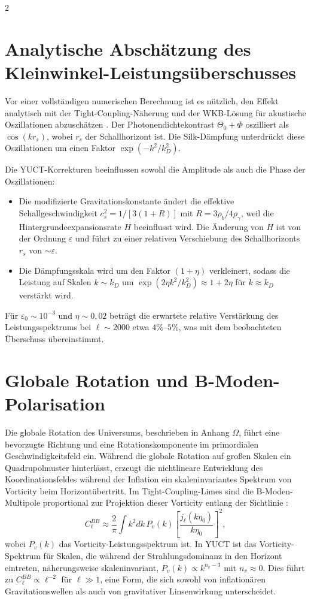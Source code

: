 \documentclass[11pt,a4paper]{article}
\begin{document}
\begin{multicols}{2}
		\section{Analytische Abschätzung des Kleinwinkel-Leistungsüberschusses}
		
		Vor einer vollständigen numerischen Berechnung ist es nützlich, den Effekt analytisch mit der Tight-Coupling-Näherung und der WKB-Lösung für akustische Oszillationen abzuschätzen \cite{Hu1995}. Der Photonendichtekontrast $\Theta_0 + \Phi$ oszilliert als $\cos(k r_s)$, wobei $r_s$ der Schallhorizont ist. Die Silk-Dämpfung unterdrückt diese Oszillationen um einen Faktor $\exp(-k^2/k_D^2)$.
		
		Die YUCT-Korrekturen beeinflussen sowohl die Amplitude als auch die Phase der Oszillationen:
		\begin{itemize}
			\item Die modifizierte Gravitationskonstante ändert die effektive Schallgeschwindigkeit $c_s^2 = 1/[3(1+R)]$ mit $R = 3\rho_b/4\rho_\gamma$, weil die Hintergrundeexpansionsrate $H$ beeinflusst wird. Die Änderung von $H$ ist von der Ordnung $\varepsilon$ und führt zu einer relativen Verschiebung des Schallhorizonts $r_s$ von $\sim \varepsilon$.
			\item Die Dämpfungsskala wird um den Faktor $(1+\eta)$ verkleinert, sodass die Leistung auf Skalen $k \sim k_D$ um $\exp(2\eta k^2/k_D^2) \approx 1 + 2\eta$ für $k \approx k_D$ verstärkt wird.
		\end{itemize}
		Für $\varepsilon_0 \sim 10^{-3}$ und $\eta \sim 0,02$ beträgt die erwartete relative Verstärkung des Leistungsspektrums bei $\ell \sim 2000$ etwa $4\%$--$5\%$, was mit dem beobachteten Überschuss übereinstimmt.
		
		\section{Globale Rotation und B-Moden-Polarisation}
		
		Die globale Rotation des Universums, beschrieben in Anhang $\Omega$, führt eine bevorzugte Richtung und eine Rotationskomponente im primordialen Geschwindigkeitsfeld ein. Während die globale Rotation auf großen Skalen ein Quadrupolmuster hinterlässt, erzeugt die nichtlineare Entwicklung des Koordinationsfeldes während der Inflation ein skaleninvariantes Spektrum von Vorticity beim Horizontübertritt. Im Tight-Coupling-Limes sind die B-Moden-Multipole proportional zur Projektion dieser Vorticity entlang der Sichtlinie \cite{Cooray2005}:
		\begin{equation}
			C_\ell^{BB} \approx \frac{2}{\pi} \int k^2 dk \, P_v(k) \left[ \frac{j_\ell(k\eta_0)}{k\eta_0} \right]^2,
		\end{equation}
		wobei $P_v(k)$ das Vorticity-Leistungsspektrum ist. In YUCT ist das Vorticity-Spektrum für Skalen, die während der Strahlungsdominanz in den Horizont eintreten, näherungsweise skaleninvariant, $P_v(k) \propto k^{n_v-3}$ mit $n_v \approx 0$. Dies führt zu $C_\ell^{BB} \propto \ell^{-2}$ für $\ell \gg 1$, eine Form, die sich sowohl von inflationären Gravitationswellen als auch von gravitativer Linsenwirkung unterscheidet.
		

\end{multicols}
\end{document}
